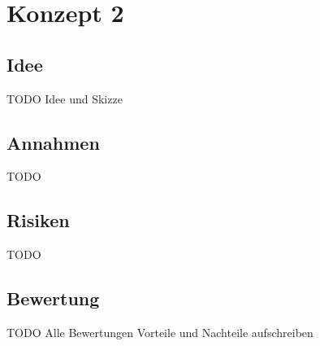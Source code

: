 \section{Konzept 2}

\subsection{Idee}
TODO Idee und Skizze

\subsection{Annahmen}
TODO

\subsection{Risiken}
TODO

\subsection{Bewertung}
TODO Alle Bewertungen
Vorteile und Nachteile aufschreiben